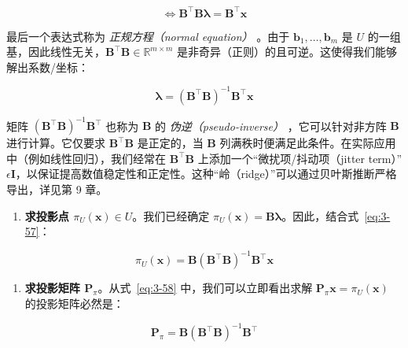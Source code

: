\begin{equation}
\iff \boldsymbol{B}^\top \boldsymbol{B} \boldsymbol{\lambda} = \boldsymbol{B}^\top \boldsymbol{x}
\tag{3.56}\label{eq:3-56}
\end{equation}

最后一个表达式称为 \emph{正规方程（normal equation）} 。由于 $ \boldsymbol{b}_1, \ldots, \boldsymbol{b}_m $ 是 $ U $ 的一组基，因此线性无关，$ \boldsymbol{B}^\top \boldsymbol{B} \in \mathbb{R}^{m \times m} $ 是非奇异（正则）的且可逆。这使得我们能够解出系数/坐标：

\begin{equation}
\boldsymbol{\lambda} = (\boldsymbol{B}^\top \boldsymbol{B})^{-1} \boldsymbol{B}^\top \boldsymbol{x}
\tag{3.57}\label{eq:3-57}
\end{equation}

矩阵 $ (\boldsymbol{B}^\top \boldsymbol{B})^{-1} \boldsymbol{B}^\top $ 也称为 $ \boldsymbol{B} $ 的 \emph{伪逆（pseudo-inverse）} ，它可以针对非方阵 $ \boldsymbol{B} $ 进行计算。它仅要求 $ \boldsymbol{B}^\top \boldsymbol{B} $ 是正定的，当 $ \boldsymbol{B} $ 列满秩时便满足此条件。在实际应用中（例如线性回归），我们经常在 $ \boldsymbol{B}^\top \boldsymbol{B} $ 上添加一个“微扰项/抖动项（jitter term）” $ \epsilon \boldsymbol{I} $，以保证提高数值稳定性和正定性。这种“岭（ridge）”可以通过贝叶斯推断严格导出，详见第 9 章。

\begin{enumerate}
\item \textbf{求投影点 $ \pi_U(\boldsymbol{x}) \in U $}。我们已经确定 $ \pi_U(\boldsymbol{x}) = \boldsymbol{B} \boldsymbol{\lambda} $。因此，结合式~\eqref{eq:3-57}：
\end{enumerate}

\begin{equation}
\pi_U(\boldsymbol{x}) = \boldsymbol{B} (\boldsymbol{B}^\top \boldsymbol{B})^{-1} \boldsymbol{B}^\top \boldsymbol{x}
\tag{3.58}\label{eq:3-58}
\end{equation}

\begin{enumerate}
\item \textbf{求投影矩阵 $ \boldsymbol{P}_\pi $}。从式~\eqref{eq:3-58} 中，我们可以立即看出求解 $ \boldsymbol{P}_\pi \boldsymbol{x} = \pi_U(\boldsymbol{x}) $ 的投影矩阵必然是：
\end{enumerate}

\begin{equation}
\boldsymbol{P}_\pi = \boldsymbol{B} (\boldsymbol{B}^\top \boldsymbol{B})^{-1} \boldsymbol{B}^\top
\tag{3.59}\label{eq:3-59}
\end{equation}

